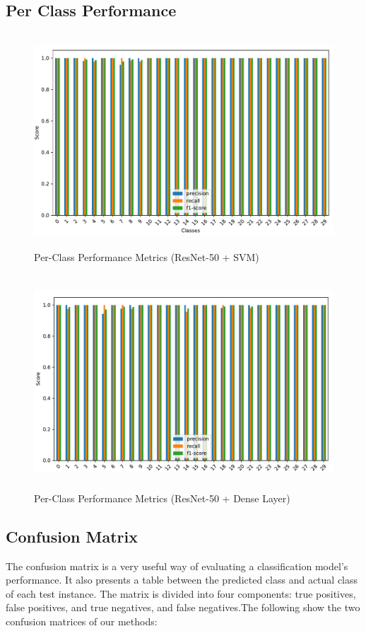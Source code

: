 \newpage
\subsection{Per Class Performance}
\label{sec:sec4_3_3}

\begin{figure}[H]
\centering
\includegraphics[height=8cm]{./fig/per_class.pdf} 
\centering
\caption{Per-Class Performance Metrics (ResNet-50 + SVM)}
\label{per_class_svm}
\end{figure}

\begin{figure}[H]
\centering
\includegraphics[height=8cm]{./fig/per_class2.pdf} 
\centering
\caption{Per-Class Performance Metrics (ResNet-50 + Dense Layer)}
\label{per_class_dense}
\end{figure}

\newpage
\subsection{Confusion Matrix}
\label{sec:sec4_3_4}
The confusion matrix is a very useful way of evaluating a classification model’s performance. It also presents a table between the predicted class and actual class of each test instance. The matrix is divided into four components: true positives, false positives, and true negatives, and false negatives.The following show the two confusion matrices of our methods:

